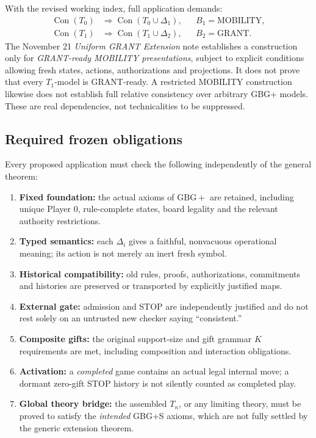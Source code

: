 \documentclass[11pt,letterpaper]{article}
\theoremstyle{definition}
\newcommand{\Con}{\operatorname{Con}}
\newcommand{\Gb}{\mathrm{GBG+}}
\begin{document}
With the revised working index, full application demands:
\begin{align*}
\Con(T_0)&\Longrightarrow\Con(T_0\cup\Delta_1),
&& B_1=\mathrm{MOBILITY},\\
\Con(T_1)&\Longrightarrow\Con(T_1\cup\Delta_2),
&& B_2=\mathrm{GRANT}.
\end{align*}
The November 21 \emph{Uniform GRANT Extension} note establishes a construction only for \emph{GRANT-ready MOBILITY presentations}, subject to explicit conditions allowing fresh states, actions, authorizations and projections. It does not prove that every \(T_1\)-model is GRANT-ready. A restricted MOBILITY construction likewise does not establish full relative consistency over arbitrary GBG+ models. These are real dependencies, not technicalities to be suppressed.

\subsection{Required frozen obligations}

Every proposed application must check the following independently of the general theorem:
\begin{enumerate}[label=\arabic*.]
\item \textbf{Fixed foundation:} the actual axioms of \(\Gb\) are retained, including unique Player 0, rule-complete states, board legality and the relevant authority restrictions.
\item \textbf{Typed semantics:} each \(\Delta_i\) gives a faithful, nonvacuous operational meaning; its action is not merely an inert fresh symbol.
\item \textbf{Historical compatibility:} old rules, proofs, authorizations, commitments and histories are preserved or transported by explicitly justified maps.
\item \textbf{External gate:} admission and STOP are independently justified and do not rest solely on an untrusted new checker saying ``consistent.''
\item \textbf{Composite gifts:} the original support-size and gift grammar \(K\) requirements are met, including composition and interaction obligations.
\item \textbf{Activation:} a \emph{completed} game contains an actual legal internal move; a dormant zero-gift STOP history is not silently counted as completed play.
\item \textbf{Global theory bridge:} the assembled \(T_n\), or any limiting theory, must be proved to satisfy the \emph{intended} GBG+S axioms, which are not fully settled by the generic extension theorem.
\end{enumerate}
\end{document}
